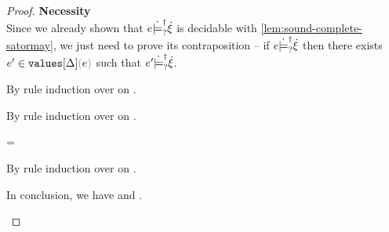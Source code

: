\begin{proof}
  \textbf{Necessity} \\
  Since we already shown that $e \dot{\models}_{?}^{\dag} \dot{\xi}$ is decidable with
  \autoref{lem:sound-complete-satormay}, we just need to prove its
  contraposition -- if $e \dot{\models}_{?}^{\dag} \dot{\xi}$ then there exists
  $\inValues{e'}{\Delta}{e}$ such that $e' \dot{\models}_{?}^{\dag} \dot{\xi}$.
  \begin{pfsteps}
  \item {}  
  \end{pfsteps}
  By rule induction over  on .
  \begin{byCases}
  \item[\text{(\ref{rule:CSMSSat})}]
    \begin{pfsteps}
    \item {}  
    \end{pfsteps}
    By rule induction over  on .
    \begin{byCases}
    \item[\text{(\ref{rule:CSTruth})}]
      \begin{pfsteps}
      \item \hxi = \ctruth {}
      \end{pfsteps}
      By rule induction over  on .
      \begin{byCases}
      \item[\text{(\ref{rule:FVal})}]
        \begin{pfsteps}
        \item {} 
        \item {}  
        \end{pfsteps}
        In conclusion, we have  and .
      \item[\text{(\ref{rule:FIndet})}]
        \begin{pfsteps}
        \item {} 
        \item {}  

\end{pfsteps}
\end{byCases}
\end{byCases}
\end{byCases}
\end{proof}
